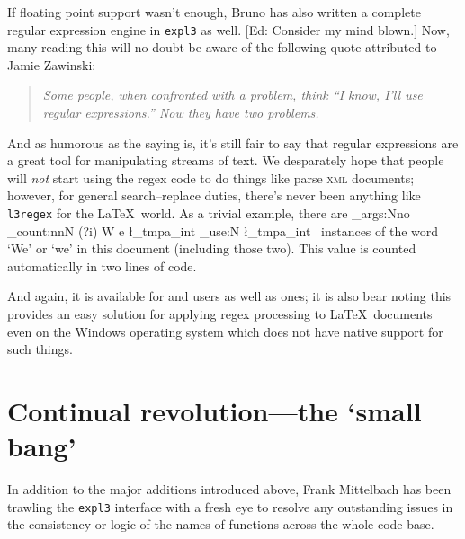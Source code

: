 \documentclass{ltnews}
\def\DTX{\textsc{dtx}}
\def\STY{\textsc{sty}}
\begin{document}
If floating point support wasn't enough, Bruno has also written a complete regular expression engine in \texttt{expl3} as well.
[Ed: Consider my mind blown.]
Now, many reading this will no doubt be aware of the following quote attributed to Jamie Zawinski:
\begin{quote}\itshape
Some people, when confronted with a problem, think
``I know, I'll use regular expressions.''
Now they have two problems.
\end{quote}
And as humorous as the saying is, it's still fair to say that regular expressions are a great tool for manipulating streams of text.
We desparately hope that people will \emph{not} start using the regex code to do things like parse \textsc{xml} documents; however, for general search--replace duties, there's never been anything like \texttt{l3regex} for the \LaTeX\ world.
As a trivial example, there are
\CatchFileDef{}%
\ExplSyntaxOn
\exp_args:Nno \regex_count:nnN { (?i) W e } {\thisfile} \l_tmpa_int
\int_use:N \l_tmpa_int
\ExplSyntaxOff
~instances of the word `We' or `we' in this document (including those two).
This value is counted automatically in two lines of code.

And again, it is available for  and  users as well as  ones; it is also bear noting this provides an easy solution for applying regex processing to \LaTeX\ documents even on the Windows operating system which does not have native support for such things.

\iffalse
\section{docstrip}

We're considering updating docstrip for \LaTeX3 code.
This will allow verbose module names in the \DTX\ code to be written using a \texttt{@@} shorthand which is replaced when the \STY\ file is extracted.
There are two advantages to using this syntax: easier to type, and the possibility of a clear separation between internal package commands and functions intended to be used by external programmers.
\fi

\section{Continual revolution---the `small bang'}

In addition to the major additions introduced above, Frank Mittelbach has been trawling the \texttt{expl3} interface with a fresh eye to resolve any outstanding issues in the consistency or logic of the names of functions across the whole code base.
\end{document}
